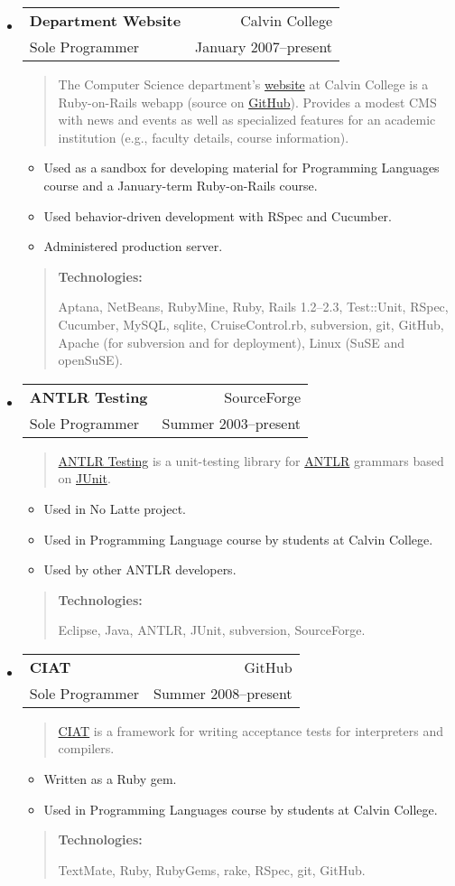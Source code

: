 \documentclass[letterpaper,10pt]{article}
\makeatletter
\newcommand{\resitem}[1]{\item #1 \vspace{-2pt}}
\newcommand{\ressubheading}[4]{ 
\begin{tabular*}{7in}{l@{\extracolsep{\fill}}r}
	\textbf{#1} & #2 \\
	{#3} & {#4} \\
\end{tabular*}
\vspace{-6pt}}
\newenvironment{comment}{
\begin{quote}
}{
\end{quote}
}
\newenvironment{technologies}{
\begin{comment}
  \textbf{Technologies:}
}{
\end{comment}
}
\newenvironment{descriptio}{
\begin{comment}
}{
\end{comment}
}
\newenvironment{project}[4]{
\setlength{\parskip}{0pt}
\setlength{\topsep}{0pt}
\setlength{\itemsep}{0pt}
\setlength{\parsep}{0pt}
\setlength{\partopsep}{0pt}
\item \ressubheading{#1}{#2}{#3}{#4}
}{\medskip}
\makeatother
\begin{document}
\begin{itemize}
	\newpage
	
	\begin{project}{Department Website}{Calvin College}{Sole Programmer}{January 2007--present}
	  \begin{descriptio}
	  	The Computer Science department's \href{http://cs.calvin.edu/}{website} at Calvin College is a Ruby-on-Rails webapp (source on \href{http://www.github.com/jdfrens/calvincs}{GitHub}).  Provides a modest CMS with news and events as well as specialized features for an academic institution (e.g., faculty details, course information).
	  \end{descriptio}
	  \begin{itemize}
	    \resitem{Used as a sandbox for developing material for Programming Languages course and a January-term Ruby-on-Rails course.}
	    \resitem{Used behavior-driven development with RSpec and Cucumber.}
	  	\resitem{Administered production server.}
	  \end{itemize}
	  \begin{technologies}
	    Aptana, NetBeans, RubyMine, Ruby, Rails 1.2--2.3, Test::Unit, RSpec, Cucumber, MySQL, sqlite, CruiseControl.rb, subversion, git, GitHub, Apache (for subversion and for deployment), Linux (SuSE and openSuSE).
	  \end{technologies}
	\end{project}

	\begin{project}{ANTLR Testing}{SourceForge}{Sole Programmer}{Summer 2003--present}
		\begin{descriptio}
			\href{http://antlr-testing.sourceforge.net/}{ANTLR Testing} is a unit-testing library for \href{http://www.antlr.org/}{ANTLR} grammars based on \href{http://junit.org/}{JUnit}.
		\end{descriptio}
		\begin{itemize}
			\resitem{Used in No Latte project.}
			\resitem{Used in Programming Language course by students at Calvin College.}
			\resitem{Used by other ANTLR developers.}
		\end{itemize}
		\begin{technologies}
		  Eclipse, Java, ANTLR, JUnit, subversion, SourceForge.
		\end{technologies}
	\end{project}
	
	\begin{project}{CIAT}{GitHub}{Sole Programmer}{Summer 2008--present}
	  \begin{descriptio}
	  	\href{http://jdfrens.github.com/ciat/}{CIAT} is a framework for writing acceptance tests for interpreters and compilers.
	  \end{descriptio}
	  \begin{itemize}
	  	\resitem{Written as a Ruby gem.}
			\resitem{Used in Programming Languages course by students at Calvin College.}
	  \end{itemize}
	  \begin{technologies}
	    TextMate, Ruby, RubyGems, rake, RSpec, git, GitHub.
	  \end{technologies}
	\end{project}


\end{itemize}
\end{document}
